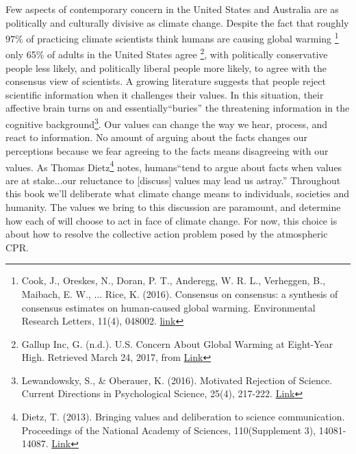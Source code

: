 Few aspects of contemporary concern in the United States and Australia are as politically and culturally divisive as climate change. Despite the fact that roughly $97\%$ of practicing climate scientists think humans are causing global warming \footnote{Cook, J., Oreskes, N., Doran, P. T., Anderegg, W. R. L., Verheggen, B., Maibach, E. W., ... Rice, K. (2016). Consensus on consensus: a synthesis of consensus estimates on human-caused global warming. Environmental Research Letters, 11(4), 048002. \href{https://doi.org/10.1088/1748-9326/11/4/048002}{link}} only 65\% of adults in the United States agree \footnote{Gallup Inc, G. (n.d.). U.S. Concern About Global Warming at Eight-Year High. Retrieved March 24, 2017, from \href{http://www.gallup.com/poll/190010/concern-global-warming-eight-year-high.aspx}{Link}}, with politically conservative people less likely, and politically liberal people more likely, to agree with the consensus view of scientists. A growing literature suggests that people reject scientific information when it challenges their values. In this situation, their affective brain turns on and essentially``buries'' the threatening information in the cognitive background\footnote{Lewandowsky, S., \& Oberauer, K. (2016). Motivated Rejection of Science. Current Directions in Psychological Science, 25(4), 217-222. \href{https://doi.org/10.1177/0963721416654436}{Link}}. Our values can change the way we hear, process, and react to information. No amount of arguing about the facts changes our perceptions because we fear agreeing to the facts means disagreeing with our values. As Thomas Dietz\footnote{Dietz, T. (2013). Bringing values and deliberation to science communication. Proceedings of the National Academy of Sciences, 110(Supplement 3), 14081-14087. \href{https://doi.org/10.1073/pnas.1212740110}{Link}} notes, humans``tend to argue about facts when values are at stake...our reluctance to [discuss] values may lead us astray.'' Throughout this book we'll deliberate what climate change means to individuals, societies and humanity. The values we bring to this discussion are paramount, and determine how each of will choose to act in face of climate change. For now, this choice is about how to resolve the collective action problem posed by the atmospheric CPR.   

 
